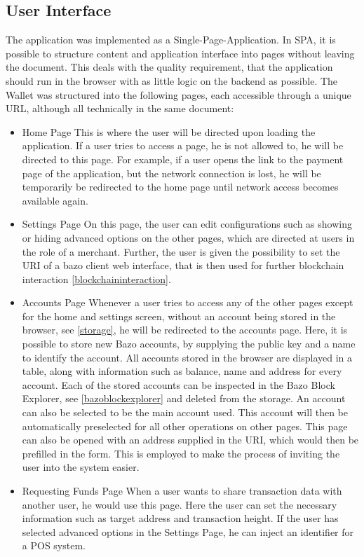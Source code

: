 \subsection{User Interface}
The application was implemented as a Single-Page-Application. In SPA, it is possible to structure content and application interface into pages without leaving the document. %
This deals with the quality requirement, that the application should run in the browser with as little logic on the backend as possible. The Wallet was structured into the following pages, each accessible through a unique URL, although all technically in the same document:
\begin{itemize}
\item Home Page
This is where the user will be directed upon loading the application. If a user tries to access a page, he is not allowed to, he will be directed to this page. For example, if a user opens the link to the payment page of the application, but the network connection is lost, he will be temporarily be redirected to the home page until network access becomes available again.
\item Settings Page
On this page, the user can edit configurations such as showing or hiding advanced options on the other pages, which are directed at users in the role of a merchant. Further, the user is given the possibility to set the URI of a bazo client web interface, that is then used for further blockchain interaction \ref{blockchaininteraction}.
\item Accounts Page
Whenever a user tries to access any of the other pages except for the home and settings screen, without an account being stored in the browser, see \ref{storage}, he will be redirected to the accounts page. Here, it is possible to store new Bazo accounts, by supplying the public key and a name to identify the account. All accounts stored in the browser are displayed in a table, along with information such as balance, name and address for every account. Each of the stored accounts can be inspected in the Bazo Block Explorer, see \ref{bazoblockexplorer} and deleted from the storage. An account can also be selected to be the main account used. This account will then be automatically preselected for all other operations on other pages.
This page can also be opened with an address supplied in the URI, which would then be prefilled in the form. This is employed to make the process of inviting the user into the system easier.
\item Requesting Funds Page
When a user wants to share transaction data with another user, he would use this page. Here the user can set the necessary information such as target address and transaction height. If the user has selected advanced options in the Settings Page, he can inject an identifier for a POS system. 

\end{itemize}
